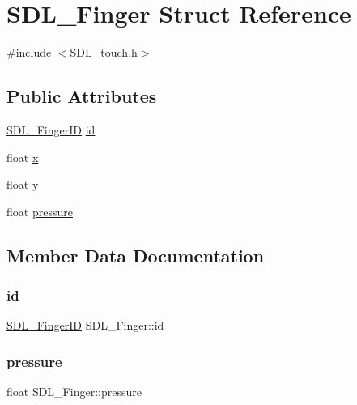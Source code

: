 \hypertarget{struct_s_d_l___finger}{}\section{S\+D\+L\+\_\+\+Finger Struct Reference}
\label{struct_s_d_l___finger}


{\ttfamily \#include $<$S\+D\+L\+\_\+touch.\+h$>$}

\subsection*{Public Attributes}
\begin{DoxyCompactItemize}
\item 
\mbox{\hyperlink{_s_d_l__touch_8h_a5fa58141f78415ca09645af359ad2250}{S\+D\+L\+\_\+\+Finger\+ID}} \mbox{\hyperlink{struct_s_d_l___finger_a3cec630146eeec5bd6299a9387a6f16a}{id}}
\item 
float \mbox{\hyperlink{struct_s_d_l___finger_ab91dfbd03c3215560457fef44e1c7755}{x}}
\item 
float \mbox{\hyperlink{struct_s_d_l___finger_a0a2c7a06ae641940111e03801c672cf9}{y}}
\item 
float \mbox{\hyperlink{struct_s_d_l___finger_a0ecb50c7fd699d59899ac60c941bdee6}{pressure}}
\end{DoxyCompactItemize}


\subsection{Member Data Documentation}
\mbox{\label{struct_s_d_l___finger_a3cec630146eeec5bd6299a9387a6f16a}} 
\subsubsection{\texorpdfstring{id}{id}}
{\footnotesize\ttfamily \mbox{\hyperlink{_s_d_l__touch_8h_a5fa58141f78415ca09645af359ad2250}{S\+D\+L\+\_\+\+Finger\+ID}} S\+D\+L\+\_\+\+Finger\+::id}

\mbox{\label{struct_s_d_l___finger_a0ecb50c7fd699d59899ac60c941bdee6}} 
\subsubsection{\texorpdfstring{pressure}{pressure}}
{\footnotesize\ttfamily float S\+D\+L\+\_\+\+Finger\+::pressure}

